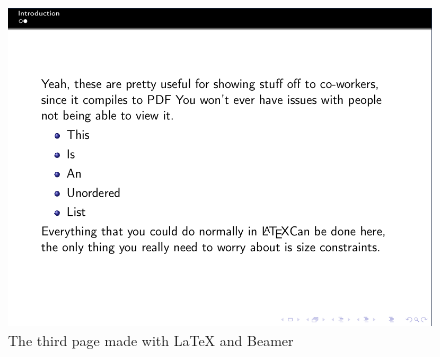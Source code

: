 \documentclass[12pt, letterpaper, oneside]{article} \usepackage[utf8]{inputenc}
\begin{document}
\begin{figure}[H]
	\includegraphics[width=\linewidth]{page3}
	\caption{The third page made with \LaTeX{} and Beamer}
\end{figure}
\end{document}
